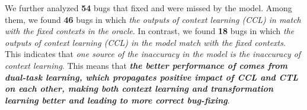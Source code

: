 
We further analyzed {\bf 54} bugs that {\tool} fixed and were missed
by the  model. Among them, we found {\bf 46} bugs in
which {\em the outputs of context learning (CCL) in {\tool} match with
  the fixed contexts in the oracle}. In contrast, we found {\bf 18}
bugs in which {\em the outputs of context learning (CCL) in the
   model match with the fixed contexts}. This
indicates that {\em one source of the inaccuracy in the
   model is the inaccuracy of context learning}. This
means that {\bf {\em the better performance of {\tool} comes from
    dual-task learning, which propagates positive impact of CCL and
    CTL on each other, making both context learning and transformation
    learning better and leading to more correct bug-fixing}}.






\vspace{-2pt}
